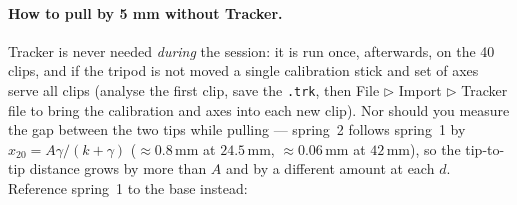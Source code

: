 \documentclass[11pt,a4paper]{article}
\newcommand{\un}[1]{\,\mathrm{#1}}
\begin{document}
\paragraph{How to pull by 5 mm without Tracker.} Tracker is never needed \emph{during} the session: it is run once, afterwards, on the 40 clips, and if the tripod is not moved a single calibration stick and set of axes serve all clips (analyse the first clip, save the \texttt{.trk}, then \textsf{File $\triangleright$ Import $\triangleright$ Tracker file} to bring the calibration and axes into each new clip). Nor should you measure the gap between the two tips while pulling --- spring~2 follows spring~1 by $x_{20}=A\gamma/(k+\gamma)$ ($\approx0.8\un{mm}$ at $24.5\un{mm}$, $\approx0.06\un{mm}$ at $42\un{mm}$), so the tip-to-tip distance grows by more than $A$ and by a different amount at each $d$. Reference spring~1 to the base instead:
\end{document}
